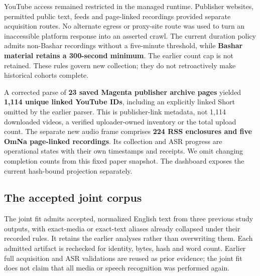 \documentclass[
  11pt,
]{article}
\begin{document}
YouTube access remained restricted in the managed runtime. Publisher
websites, permitted public text, feeds and page-linked recordings
provided separate acquisition routes. No alternate egress or proxy-site
route was used to turn an inaccessible platform response into an
asserted crawl. The current duration policy admits non-Bashar recordings
without a five-minute threshold, while \textbf{Bashar material retains a
300-second minimum}. The earlier count cap is not retained. These rules
govern new collection; they do not retroactively make historical cohorts
complete.

A corrected parse of \textbf{23 saved Magenta publisher archive pages}
yielded \textbf{1,114 unique linked YouTube IDs}, including an
explicitly linked Short omitted by the earlier parser. This is
publisher-link metadata, not 1,114 downloaded videos, a verified
uploader-owned inventory or the total upload count. The separate new
audio frame comprises \textbf{224 RSS enclosures and five OmNa
page-linked recordings}. Its collection and ASR progress are operational
states with their own timestamps and receipts. We omit changing
completion counts from this fixed paper snapshot. The dashboard exposes
the current hash-bound projection separately.

\FloatBarrier

\subsection{The accepted joint corpus}\label{the-accepted-joint-corpus}

The joint fit admits accepted, normalized English text from three
previous study outputs, with exact-media or exact-text aliases already
collapsed under their recorded rules. It retains the earlier analyses
rather than overwriting them. Each admitted artifact is rechecked for
identity, bytes, hash and word count. Earlier full acquisition and ASR
validations are reused as prior evidence; the joint fit does not claim
that all media or speech recognition was performed again.
\end{document}
